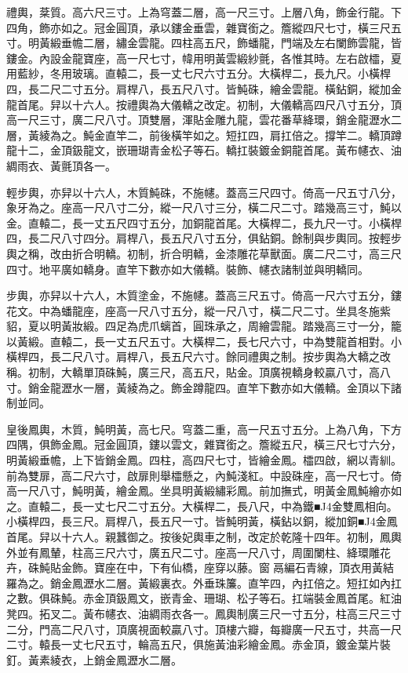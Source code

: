 \begin{pinyinscope}
禮輿，棻質。高六尺三寸。上為穹蓋二層，高一尺三寸。上層八角，飾金行龍。下四角，飾亦如之。冠金圓頂，承以鏤金垂雲，雜寶銜之。簷縱四尺七寸，橫三尺五寸。明黃緞垂幨二層，繡金雲龍。四柱高五尺，飾蟠龍，門端及左右闌飾雲龍，皆鏤金。內設金龍寶座，高一尺七寸，幃用明黃雲緞紗氈，各惟其時。左右啟櫺，夏用藍紗，冬用玻璃。直轅二，長一丈七尺六寸五分。大橫桿二，長九尺。小橫桿四，長二尺二寸五分。肩桿八，長五尺八寸。皆魨硃，繪金雲龍。橫鉆銅，縱加金龍首尾。舁以十六人。按禮輿為大儀轎之改定。初制，大儀轎高四尺八寸五分，頂高一尺三寸，廣二尺八寸。頂雙層，渾貼金雕九龍，雲花番草絳環，銷金龍瀝水二層，黃綾為之。魨金直竿二，前後橫竿如之。短扛四，肩扛倍之。撐竿二。轎頂蹲龍十二，金頂鈒龍文，嵌珊瑚青金松子等石。轎扛裝鍍金銅龍首尾。黃布幰衣、油綢雨衣、黃氈頂各一。

輕步輿，亦舁以十六人，木質魨硃，不施幰。蓋高三尺四寸。倚高一尺五寸八分，象牙為之。座高一尺八寸二分，縱一尺八寸三分，橫二尺二寸。踏幾高三寸，魨以金。直轅二，長一丈五尺四寸五分，加銅龍首尾。大橫桿二，長九尺一寸。小橫桿四，長二尺八寸四分。肩桿八，長五尺八寸五分，俱鉆銅。餘制與步輿同。按輕步輿之稱，改由折合明轎。初制，折合明轎，金漆雕花草獸面。廣二尺二寸，高三尺四寸。地平廣如轎身。直竿下數亦如大儀轎。裝飾、幰衣諸制並與明轎同。

步輿，亦舁以十六人，木質塗金，不施幰。蓋高三尺五寸。倚高一尺六寸五分，鏤花文。中為蟠龍座，座高一尺八寸五分，縱一尺八寸，橫二尺二寸。坐具冬施紫貂，夏以明黃妝緞。四足為虎爪螭首，圓珠承之，周繪雲龍。踏幾高三寸一分，籠以黃緞。直轅二，長一丈五尺五寸。大橫桿二，長七尺六寸，中為雙龍首相對。小橫桿四，長二尺八寸。肩桿八，長五尺六寸。餘同禮輿之制。按步輿為大轎之改稱。初制，大轎單頂硃魨，廣三尺，高五尺，貼金。頂廣視轎身較贏八寸，高八寸。銷金龍瀝水一層，黃綾為之。飾金蹲龍四。直竿下數亦如大儀轎。金頂以下諸制並同。

皇後鳳輿，木質，魨明黃，高七尺。穹蓋二重，高一尺五寸五分。上為八角，下方四隅，俱飾金鳳。冠金圓頂，鏤以雲文，雜寶銜之。簷縱五尺，橫三尺七寸六分，明黃緞垂幨，上下皆銷金鳳。四柱，高四尺七寸，皆繪金鳳。櫺四啟，網以青紃。前為雙扉，高二尺六寸，啟扉則舉櫺懸之，內魨淺紅。中設硃座，高一尺七寸。倚高一尺八寸，魨明黃，繪金鳳。坐具明黃緞繡彩鳳。前加撫式，明黃金鳳魨繪亦如之。直轅二，長一丈七尺二寸五分。大橫桿二，長八尺，中為鐵■J4金雙鳳相向。小橫桿四，長三尺。肩桿八，長五尺一寸。皆魨明黃，橫鉆以銅，縱加銅■J4金鳳首尾。舁以十六人。親蠶御之。按後妃輿車之制，改定於乾隆十四年。初制，鳳輿外並有鳳輦，柱高三尺六寸，廣五尺二寸。座高一尺八寸，周圍闌柱、絳環雕花卉，硃魨貼金飾。寶座在中，下有仙橋，座穿以藤。窗鬲編石青線，頂衣用黃結羅為之。銷金鳳瀝水二層。黃緞裏衣。外垂珠簾。直竿四，內扛倍之。短扛如內扛之數。俱硃魨。赤金頂鈒鳳文，嵌青金、珊瑚、松子等石。扛端裝金鳳首尾。紅油凳四。拓叉二。黃布幰衣、油綢雨衣各一。鳳輿制廣三尺一寸五分，柱高三尺三寸二分，門高二尺八寸，頂廣視面較贏八寸。頂樓六瓣，每瓣廣一尺五寸，共高一尺二寸。轅長一丈七尺五寸，輪高五尺，俱施黃油彩繪金鳳。赤金頂，鍍金葉片裝釘。黃素綾衣，上銷金鳳瀝水二層。


\end{pinyinscope}
